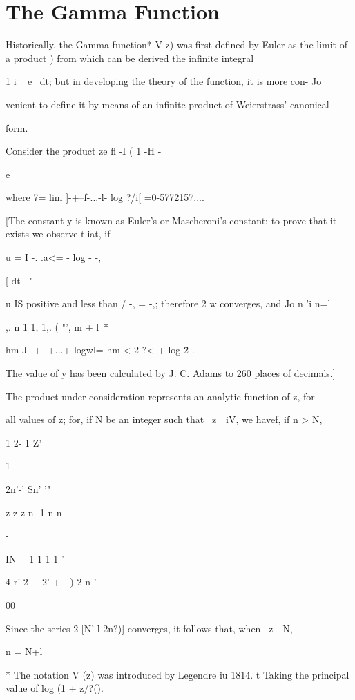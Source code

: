 %
%
\chapter{The Gamma Function}


Historically, the Gamma-function* V z) was first defined by Euler as
the limit of a product ) from which can be derived the
infinite integral

1 i ~ e~ dt; but in developing the theory of the function, it is more
con- Jo

venient to define it by means of an infinite product of Weierstrass'
canonical

form.

Consider the product ze fl -I ( 1 -H -

e

where 7= lim ]-+--f-...-l- log ?/i[ =0-5772157....

[The constant y is known as Euler's or Mascheroni's constant; to
prove that it exists we observe tliat, if

u = I -. .a<= - log - -,

[ dt \ "

u IS positive and less than / -, = -,; therefore 2 w converges, and Jo
n 'i n=l

,. n 1 1, 1,. ( "', m + l\ *

hm J- + -+...+ logwl= hm < 2 ?< + log \= 2 .

The value of y has been calculated by J. C. Adams to 260 places of
decimals.]

The product under consideration represents an analytic function of z,
for

all values of z; for, if N be an integer such that \ z\ \ iV, we
havef, if n > N,

1 2- 1 Z'

1

2n'-' Sn' '"



z z z n- 1 n n-

-

IN \ \ 1 1 1 1 '

 4 r' 2 + 2' +---) 2 n '

00

Since the series 2 [N' l 2n?)] converges, it follows that, when \ z\ \
N,

n = N+l

* The notation V (z) was introduced by Legendre iu 1814. t Taking the
principal value of log (1 + z/?().

